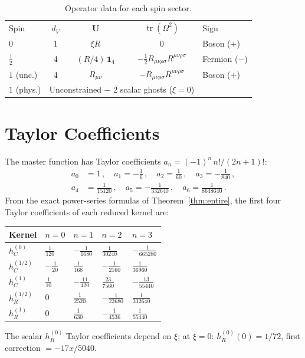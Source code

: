 \documentclass[aps,prd,twocolumn,superscriptaddress,nofootinbib,floatfix]{revtex4-2}
\theoremstyle{definition}
\theoremstyle{remark}
\newcommand{\Riemsq}{R_{\mu\nu\rho\sigma}R^{\mu\nu\rho\sigma}}
\newcommand{\tr}{\operatorname{tr}}
\begin{document}
\begin{table}[h]
\caption{Operator data for each spin sector.}
\label{tab:operator-data}
\begin{ruledtabular}
\begin{tabular}{lcccl}
Spin & $d_V$ & $\mathbf{U}$ & $\tr(\Omega^2)$ & Sign \\
\colrule
$0$ & 1 & $\xi R$ & $0$ & Boson ($+$) \\
$\frac{1}{2}$ & 4 & $(R/4)\,\mathbf{1}_4$ & $-\frac{1}{2}\Riemsq$ & Fermion ($-$) \\
$1$ (unc.) & 4 & $R_{\mu\nu}$ & $-\Riemsq$ & Boson ($+$) \\
$1$ (phys.) & \multicolumn{3}{c}{Unconstrained $-$ 2 scalar ghosts ($\xi = 0$)} & \\
\end{tabular}
\end{ruledtabular}
\end{table}


\section{Taylor Coefficients}
\label{app:taylor}

The master function has Taylor coefficients
$a_n = (-1)^n\,n!/(2n+1)!$:
\begin{equation}
  \begin{aligned}
    a_0 &= 1\,,\quad a_1 = -\tfrac{1}{6}\,,\quad
    a_2 = \tfrac{1}{60}\,,\quad a_3 = -\tfrac{1}{840}\,,\\
    a_4 &= \tfrac{1}{15120}\,,\quad
    a_5 = -\tfrac{1}{332640}\,,\quad
    a_6 = \tfrac{1}{8648640}\,.
  \end{aligned}
\end{equation}
From the exact power-series formulas of Theorem~\ref{thm:entire}, the first
four Taylor coefficients of each reduced kernel are:
\begin{center}
\renewcommand{\arraystretch}{1.25}
\begin{tabular}{@{}lllll@{}}
  \toprule
  Kernel & $n = 0$ & $n = 1$ & $n = 2$ & $n = 3$ \\
  \midrule
  $h_C^{(0)}$ & $\frac{1}{120}$ & $-\frac{1}{1680}$ &
    $\frac{1}{30240}$ & $-\frac{1}{665280}$ \\[4pt]
  $h_C^{(1/2)}$ & $-\frac{1}{20}$ & $\frac{1}{168}$ &
    $-\frac{1}{2160}$ & $\frac{1}{36960}$ \\[4pt]
  $h_C^{(1)}$ & $\frac{1}{10}$ & $-\frac{11}{420}$ &
    $\frac{23}{7560}$ & $-\frac{13}{55440}$ \\[4pt]
  $h_R^{(1/2)}$ & $0$ & $\frac{1}{2520}$ &
    $-\frac{1}{22680}$ & $\frac{1}{332640}$ \\[4pt]
  $h_R^{(1)}$ & $0$ & $\frac{1}{630}$ &
    $-\frac{1}{4536}$ & $\frac{1}{55440}$ \\
  \bottomrule
\end{tabular}
\end{center}
The scalar $h_R^{(0)}$ Taylor coefficients depend on $\xi$; at $\xi = 0$:
$h_R^{(0)}(0) = 1/72$, first correction $= -17x/5040$.
\end{document}
